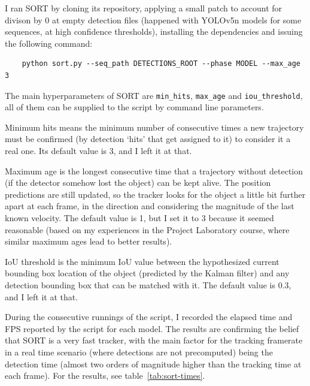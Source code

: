 I ran SORT by cloning its repository, applying a small patch to account for divison by 0 at empty detection files (happened with YOLOv5n models for some sequences, at high confidence thresholds), installing the dependencies and issuing the following command:
\begin{verbatim}
    python sort.py --seq_path DETECTIONS_ROOT --phase MODEL --max_age 3
\end{verbatim}

The main hyperparameters of SORT are \verb|min_hits|, \verb|max_age| and \verb|iou_threshold|, all of them can be supplied to the script by command line parameters.

Minimum hits means the minimum number of consecutive times a new trajectory must be confirmed (by detection `hits' that get assigned to it) to consider it a real one. Its default value is 3, and I left it at that.

Maximum age is the longest consecutive time that a trajectory without detection (if the detector somehow lost the object) can be kept alive. The position predictions are still updated, so the tracker looks for the object a little bit further apart at each frame, in the direction and considering the magnitude of the last known velocity. The default value is 1, but I set it to 3 because it seemed reasonable (based on my experiences in the Project Laboratory course, where similar maximum ages lead to better results).

IoU threshold is the minimum IoU value between the hypothesized current bounding box location of the object (predicted by the Kalman filter) and any detection bounding box that can be matched with it. The default value is 0.3, and I left it at that.

During the consecutive runnings of the script, I recorded the elapsed time and FPS reported by the script for each model. The results are confirming the belief that SORT is a very fast tracker, with the main factor for the tracking framerate in a real time scenario (where detections are not precomputed) being the detection time (almost two orders of magnitude higher than the tracking time at each frame). For the results, see table~\ref{tab:sort-times}.

